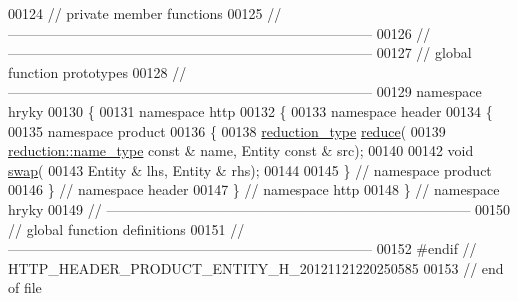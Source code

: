 \begin{DoxyCode}
00124 \textcolor{comment}{// private member functions}
00125 \textcolor{comment}{//
      ------------------------------------------------------------------------------}
00126 \textcolor{comment}{//
      ------------------------------------------------------------------------------}
00127 \textcolor{comment}{// global function prototypes}
00128 \textcolor{comment}{//
      ------------------------------------------------------------------------------}
00129 \textcolor{keyword}{namespace }hryky
00130 \{
00131 \textcolor{keyword}{namespace }http
00132 \{
00133 \textcolor{keyword}{namespace }header
00134 \{
00135 \textcolor{keyword}{namespace }product
00136 \{
00138     \hyperlink{namespacehryky_a343a9a4c36a586be5c2693156200eadc}{reduction_type} \hyperlink{namespacehryky_1_1http_a08fc36a78a8e2908140fcd102829a566}{reduce}(
00139         \hyperlink{namespacehryky_1_1reduction_ac686c30a4c8d196bbd0f05629a6b921f}{reduction::name_type} \textcolor{keyword}{const} & name, Entity \textcolor{keyword}{const} & src);
00140 
00142     \textcolor{keywordtype}{void} \hyperlink{namespacehryky_1_1http_a38e62595ad532d18fbc65ceb61973aec}{swap}(
00143         Entity & lhs, Entity & rhs);
00144 
00145 \} \textcolor{comment}{// namespace product}
00146 \} \textcolor{comment}{// namespace header}
00147 \} \textcolor{comment}{// namespace http}
00148 \} \textcolor{comment}{// namespace hryky}
00149 \textcolor{comment}{//
      ------------------------------------------------------------------------------}
00150 \textcolor{comment}{// global function definitions}
00151 \textcolor{comment}{//
      ------------------------------------------------------------------------------}
00152 \textcolor{preprocessor}{#endif // HTTP\_HEADER\_PRODUCT\_ENTITY\_H\_20121121220250585}
00153 \textcolor{preprocessor}{}\textcolor{comment}{// end of file}
\end{DoxyCode}

